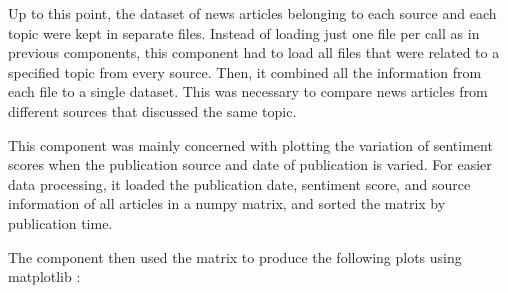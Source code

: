\documentclass{report}
\begin{document}
Up to this point, the dataset of news articles belonging to each source and each topic were kept in separate files.
Instead of loading just one file per call as in previous components, this component had to load all files that were related to a specified topic from every source.
Then, it combined all the information from each file to a single dataset.
This was necessary to compare news articles from different sources that discussed the same topic.

This component was mainly concerned with plotting the variation of sentiment scores when the publication source and date of publication is varied.
For easier data processing, it loaded the publication date, sentiment score, and source information of all articles in a numpy matrix, and sorted the matrix by publication time.

The component then used the matrix to produce the following plots using matplotlib \cite{Matplotlib}:
\end{document}
